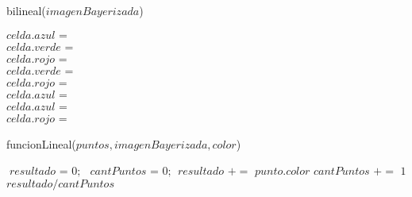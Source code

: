 \begin{algorithm}
\caption{bilineal($imagenBayerizada$)}\label{euclid}
\begin{algorithmic}[1]
   
      \State $\textit{celda.azul = funcionLineal(puntosOblicuosALaCelda,imagenBayerizada,AZUL);}$
      \State $\textit{celda.verde = funcionLineal(puntosAdyacentesALaCelda,imagenBayerizada,VERDE);}$
  \EndIf
   
      \State $\textit{celda.rojo = funcionLineal(puntosOblicuosALaCelda,imagenBayerizada,ROJO);}$
      \State $\textit{celda.verde = funcionLineal(puntosAdyacentesALaCelda,imagenBayerizada,VERDE);}$
  \EndIf
      \State $\textit{celda.rojo = funcionLineal(puntosSuperiorEInferior,imagenBayerizada,ROJO);}$ 
      \State $\textit{celda.azul = funcionLineal(puntosDerechaEIzquierda,imagenBayerizada,AZUL);}$ 
  \EndIf
      \State $\textit{celda.azul = funcionLineal(puntosSuperiorEInferior,imagenBayerizada,AZUL);}$ 
      \State $\textit{celda.rojo = funcionLineal(puntosDerechaEIzquierda,imagenBayerizada,ROJO);}$ 
  \EndIf
\EndFor
\end{algorithmic}
\end{algorithm}

\begin{algorithm}
\caption{funcionLineal($puntos,imagenBayerizada,color$)}\label{euclid}
\begin{algorithmic}[1]
\State $\textit{resultado $=$ 0;}$
\State $\textit{cantPuntos $=$ 0;}$
      \State $\textit{resultado $+=$ punto.color}$
      \State $\textit{cantPuntos $+=$ 1}$
  \EndIf
\EndFor
\Return $resultado/cantPuntos$
\end{algorithmic}
\end{algorithm}

    

    
